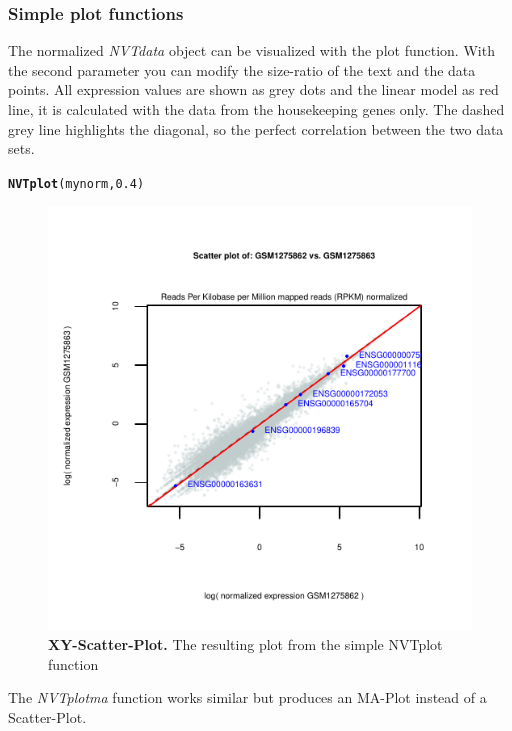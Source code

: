 \documentclass[11pt]{article}\usepackage[]{graphicx}\usepackage[usenames,dvipsnames]{color}
\makeatletter
\newcommand{\hlnum}[1]{\textcolor[rgb]{0.686,0.059,0.569}{#1}}%
\newcommand{\hlstd}[1]{\textcolor[rgb]{0.345,0.345,0.345}{#1}}%
\newcommand{\hlkwd}[1]{\textcolor[rgb]{0.737,0.353,0.396}{\textbf{#1}}}%
\newenvironment{kframe}{%
 \def\at@end@of@kframe{}%
 \ifinner\ifhmode%
  \def\at@end@of@kframe{\end{minipage}}%
  \begin{minipage}{\columnwidth}%
 \fi\fi%
 \def\FrameCommand##1{\hskip\@totalleftmargin \hskip-\fboxsep
 \colorbox{shadecolor}{##1}\hskip-\fboxsep
     \hskip-\linewidth \hskip-\@totalleftmargin \hskip\columnwidth}%
 \MakeFramed {\advance\hsize-\width
   \@totalleftmargin\z@ \linewidth\hsize
   \@setminipage}}%
 {\par\unskip\endMakeFramed%
 \at@end@of@kframe}
\newenvironment{knitrout}{}{} %
\makeatother
\begin{document}
\subsubsection{Simple plot functions}

The normalized \textit{NVTdata} object can be visualized with the plot function. With the second parameter you can modify the size-ratio of the text and the data points. All expression values are shown as grey dots and the linear model as red line, it is calculated with the data from the housekeeping genes only. The dashed grey line highlights the diagonal, so the perfect correlation between the two data sets.

\begin{knitrout}
\color{fgcolor}\begin{kframe}
\begin{alltt}
\hlkwd{NVTplot}\hlstd{(mynorm,}\hlnum{0.4}\hlstd{)}
\end{alltt}
\end{kframe}
\end{knitrout}

\begin{figure}[!h]
\centering
\includegraphics[width=.8\textwidth]{figure/simpleplot-1}
\caption{
  \textbf{XY-Scatter-Plot.}
  The resulting plot from the simple NVTplot function}
\label{fig:XY}
\end{figure}

\newpage

The \textit{NVTplotma} function works similar but produces an MA-Plot instead of a Scatter-Plot.
\end{document}
